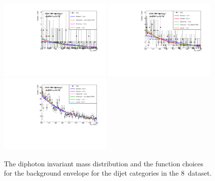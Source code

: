 \begin{figure}
  \includegraphics[width=0.49\textwidth]{analysis/plots/multipdf_plots/cat5_8TeV.pdf}
  \includegraphics[width=0.49\textwidth]{analysis/plots/multipdf_plots/cat6_8TeV.pdf}\\
  \includegraphics[width=0.49\textwidth]{analysis/plots/multipdf_plots/cat7_8TeV.pdf}
  \caption{The diphoton invariant mass distribution and the function choices for the background envelope for the dijet categories in the 8~\TeV dataset.}
  \label{fig:multipdf5}
\end{figure}

